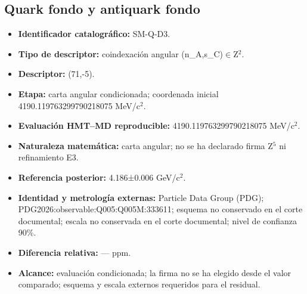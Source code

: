 \subsection{Quark fondo y antiquark fondo}
\begin{itemize}
\item \textbf{Identificador catalográfico:} SM-Q-D3.
\item \textbf{Tipo de descriptor:} coindexación angular (n\_A,s\_C)\(\in\)Z\({}^{2}\).
\item \textbf{Descriptor:} (71,-5).
\item \textbf{Etapa:} carta angular condicionada; coordenada inicial 4190.119763\allowbreak{}299790\allowbreak{}218075 MeV/c\({}^{2}\).
\item \textbf{Evaluación HMT--MD reproducible:} 4190.119763\allowbreak{}299790\allowbreak{}218075 MeV/c\({}^{2}\).
\item \textbf{Naturaleza matemática:} carta angular; no se ha declarado firma Z\({}^{5}\) ni refinamiento E3.
\item \textbf{Referencia posterior:} 4.186±\allowbreak{}0.006 GeV/c\({}^{2}\).
\item \textbf{Identidad y metrología externas:} Particle Data Group (PDG); PDG2026:\allowbreak{}observable:\allowbreak{}Q005:\allowbreak{}Q005M:\allowbreak{}333611; esquema no conservado en el corte documental; escala no conservada en el corte documental; nivel de confianza 90\%.
\item \textbf{Diferencia relativa:} --- ppm.
\item \textbf{Alcance:} evaluación condicionada; la firma no se ha elegido desde el valor comparado; esquema y escala externos requeridos para el residual.
\end{itemize}
